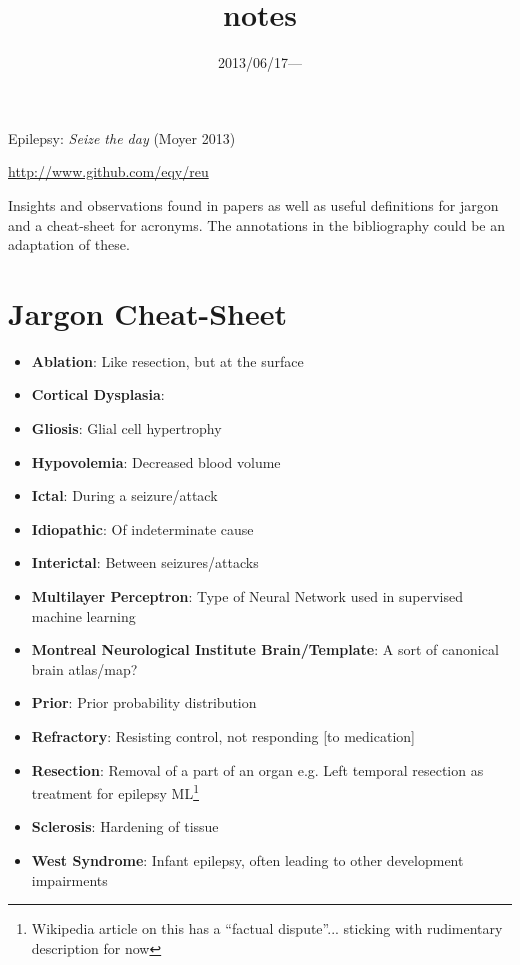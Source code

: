 \documentclass{article}
\title{\vspace{-3ex}notes}
\date{2013/06/17---}
\begin{document}
    \maketitle
    \begin{center}Epilepsy: \emph{Seize the day} (Moyer 2013)\end{center}

    \url{http://www.github.com/eqy/reu}
    
    Insights and observations found in papers as well as useful definitions for
    jargon and a cheat-sheet for acronyms. The annotations in the bibliography 
could be an adaptation of these.

    \tableofcontents
    \section{Jargon Cheat-Sheet}
        \begin{itemize}
            \item \textbf{Ablation}: Like resection, but at the surface
            \item \textbf{Cortical Dysplasia}: \item \textbf{Gliosis}: Glial 
cell hypertrophy
            \item \textbf{Hypovolemia}: Decreased blood volume
            \item \textbf{Ictal}: During a seizure/attack
            \item \textbf{Idiopathic}: Of indeterminate cause
            \item \textbf{Interictal}: Between seizures/attacks
            \item \textbf{Multilayer Perceptron}: Type of Neural Network used in 
supervised machine learning
            \item \textbf{Montreal Neurological Institute Brain/Template}: A
sort of canonical brain atlas/map?
            \item \textbf{Prior}: Prior probability distribution
            \item \textbf{Refractory}: Resisting control, not responding [to 
medication] \item \textbf{Resection}: Removal of a part of an organ e.g. Left 
temporal
            resection as treatment for epilepsy
            ML\footnote{Wikipedia article on this has a ``factual dispute''...  
sticking with
            rudimentary description for now}
            \item \textbf{Sclerosis}: Hardening of tissue
            \item \textbf{West Syndrome}: Infant epilepsy, often leading to other 
development
            impairments
        \end{itemize}
\end{document}
